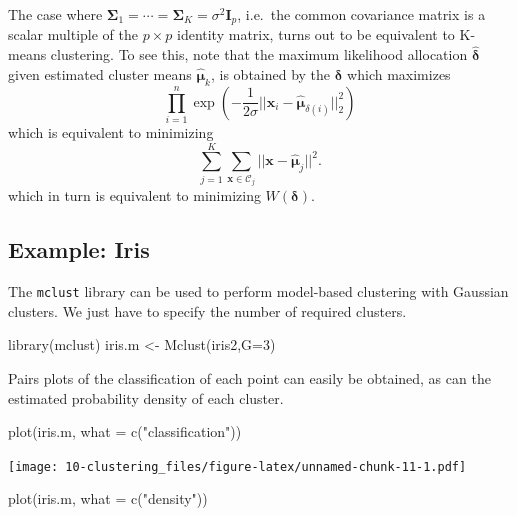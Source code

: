 \documentclass[
]{book}
\newenvironment{Shaded}{\begin{snugshade}}{\end{snugshade}}
\newcommand{\AttributeTok}[1]{\textcolor[rgb]{0.77,0.63,0.00}{#1}}
\newcommand{\DecValTok}[1]{\textcolor[rgb]{0.00,0.00,0.81}{#1}}
\newcommand{\FunctionTok}[1]{\textcolor[rgb]{0.00,0.00,0.00}{#1}}
\newcommand{\NormalTok}[1]{#1}
\newcommand{\OtherTok}[1]{\textcolor[rgb]{0.56,0.35,0.01}{#1}}
\newcommand{\StringTok}[1]{\textcolor[rgb]{0.31,0.60,0.02}{#1}}
\theoremstyle{definition}
\theoremstyle{definition}
\theoremstyle{definition}
\theoremstyle{definition}
\theoremstyle{remark}
\begin{document}
The case where \(\boldsymbol{\Sigma}_1=\cdots = \boldsymbol{\Sigma}_K=\sigma^2 \mathbf I_p\), i.e.~the common covariance matrix is a scalar multiple of the \(p \times p\) identity matrix, turns out to be equivalent to K-means clustering. To see this, note that the maximum likelihood allocation \(\hat{\boldsymbol \delta}\) given estimated cluster means \(\hat{{\boldsymbol{\mu}}}_k\), is obtained by the \(\boldsymbol \delta\) which maximizes
\[
\prod_{i=1}^n\exp(-\frac{1}{2\sigma}||\mathbf x_i-\hat{{\boldsymbol{\mu}}}_{\delta(i)}||_2^2)
\]
which is equivalent to minimizing
\[
\sum_{j=1}^K \sum_{\mathbf x\in \mathcal{C}_j} \vert \vert \mathbf x- \hat{{\boldsymbol{\mu}}}_j\vert \vert^2.
\]
which in turn is equivalent to minimizing \(W(\boldsymbol \delta)\).

\hypertarget{example-iris-1}{%
\subsection{Example: Iris}\label{example-iris-1}}

The \texttt{mclust} library can be used to perform model-based clustering with Gaussian clusters. We just have to specify the number of required clusters.

\begin{Shaded}
\begin{Highlighting}[]
\FunctionTok{library}\NormalTok{(mclust)}
\NormalTok{iris.m }\OtherTok{\textless{}{-}} \FunctionTok{Mclust}\NormalTok{(iris2,}\AttributeTok{G=}\DecValTok{3}\NormalTok{)}
\end{Highlighting}
\end{Shaded}

Pairs plots of the classification of each point can easily be obtained, as can the estimated probability density of each cluster.

\begin{Shaded}
\begin{Highlighting}[]
\FunctionTok{plot}\NormalTok{(iris.m, }\AttributeTok{what =} \FunctionTok{c}\NormalTok{(}\StringTok{"classification"}\NormalTok{))}
\end{Highlighting}
\end{Shaded}

\texttt{[image: 10-clustering\_files/figure-latex/unnamed-chunk-11-1.pdf]}

\begin{Shaded}
\begin{Highlighting}[]
\FunctionTok{plot}\NormalTok{(iris.m, }\AttributeTok{what =} \FunctionTok{c}\NormalTok{(}\StringTok{"density"}\NormalTok{))}
\end{Highlighting}
\end{Shaded}
\end{document}
